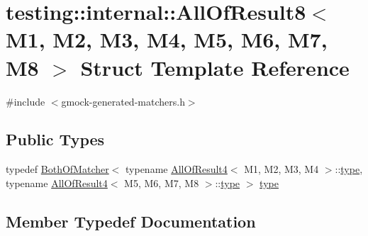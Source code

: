 \hypertarget{structtesting_1_1internal_1_1_all_of_result8}{}\section{testing\+:\+:internal\+:\+:All\+Of\+Result8$<$ M1, M2, M3, M4, M5, M6, M7, M8 $>$ Struct Template Reference}
\label{structtesting_1_1internal_1_1_all_of_result8}


{\ttfamily \#include $<$gmock-\/generated-\/matchers.\+h$>$}

\subsection*{Public Types}
\begin{DoxyCompactItemize}
\item 
typedef \hyperlink{classtesting_1_1internal_1_1_both_of_matcher}{Both\+Of\+Matcher}$<$ typename \hyperlink{structtesting_1_1internal_1_1_all_of_result4}{All\+Of\+Result4}$<$ M1, M2, M3, M4 $>$\+::\hyperlink{structtesting_1_1internal_1_1_all_of_result8_a7103892a28c35221b9e62e871c577727}{type}, typename \hyperlink{structtesting_1_1internal_1_1_all_of_result4}{All\+Of\+Result4}$<$ M5, M6, M7, M8 $>$\+::\hyperlink{structtesting_1_1internal_1_1_all_of_result8_a7103892a28c35221b9e62e871c577727}{type} $>$ \hyperlink{structtesting_1_1internal_1_1_all_of_result8_a7103892a28c35221b9e62e871c577727}{type}
\end{DoxyCompactItemize}


\subsection{Member Typedef Documentation}
\mbox{\label{structtesting_1_1internal_1_1_all_of_result8_a7103892a28c35221b9e62e871c577727}} 
